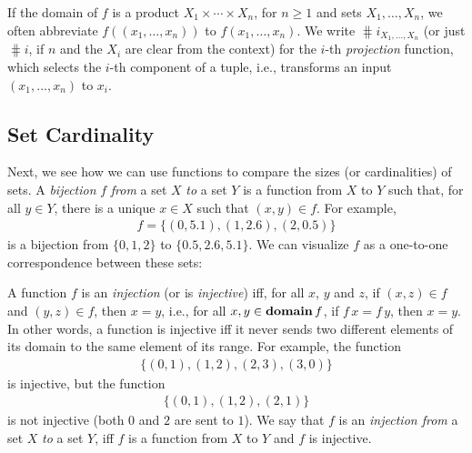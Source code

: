 If the domain of $f$ is a product $X_1\times\cdots\times X_n$,
for $n\geq 1$ and
%
sets $X_1,\ldots,X_n$, we often abbreviate $f((x_1,\ldots,x_n))$ to
$f(x_1,\ldots,x_n)$.  We write $\hash{i}_{X_1,\ldots,X_n}$ (or just
%
$\hash{i}$, if $n$ and the $X_i$ are clear from the context) for the
$i$-th \emph{projection} function, which selects the $i$-th component
%
%
of a tuple, i.e., transforms an input $(x_1,\ldots,x_n)$ to $x_i$.

\subsection{Set Cardinality}

%
%
%
%
Next, we see how we can use functions to compare the sizes
(or cardinalities) of sets.
A \emph{bijection}
%
%
$f$ \emph{from} a set $X$ \emph{to} a set $Y$ is
a function from $X$ to $Y$ such that, for all $y\in Y$, there is a
unique $x\in X$ such that $(x,y)\in f$.
For example,
\begin{gather*}
f=\{(0,5.1),(1,2.6),(2,0.5)\}
\end{gather*}
is a bijection from $\{0,1,2\}$ to $\{0.5,2.6,5.1\}$.
We can visualize $f$ as a one-to-one correspondence
%
between these sets:
\begin{center}

\end{center}

A function $f$ is an \emph{injection} (or is \emph{injective})
%
%
%
%
iff, for all $x$, $y$ and $z$, if $(x,z)\in f$ and $(y,z)\in f$, then
$x=y$, i.e., for all $x,y\in\mathbf{domain}\,f$, if $f\,x=f\,y$, then $x=y$.
In other words, a function is injective iff it never sends two
different elements of its domain to the same element of its range.
For example, the function
\begin{gather*}
\{(0, 1), (1, 2), (2, 3), (3, 0)\}
\end{gather*}
is injective, but the function
\begin{gather*}
\{(0, 1), (1, 2), (2, 1)\}
\end{gather*}
is not injective (both $0$ and $2$ are sent to $1$).  We say that $f$
is an \emph{injection from} a set $X$ \emph{to} a set $Y$, iff $f$ is
%
%
a function from $X$ to $Y$ and $f$ is injective.

